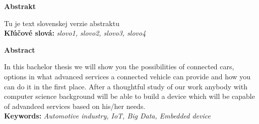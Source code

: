 {\noindent\large\bf Abstrakt}

\vspace{1.8cm}

Tu je text slovenskej verzie abstraktu
\\

{\parindent0pt \textbf{Kľúčové slová:} \emph{slovo1, slovo2, slovo3, slovo4}} 

\newpage
 {\noindent\large\bf Abstract}
  \vspace{1.8cm}
 
 In this bachelor thesis we will show you the possibilities of connected cars, options in what advanced services a connected vehicle can provide and how you can do it in the first place. After a thoughtful study of our work anybody with computer science background will be able to build a device which will be capable of advandced services based on his/her needs.\\

{\parindent0pt \textbf{Keywords:} \emph{Automotive industry, IoT, Big Data, Embedded device}}


\newpage

